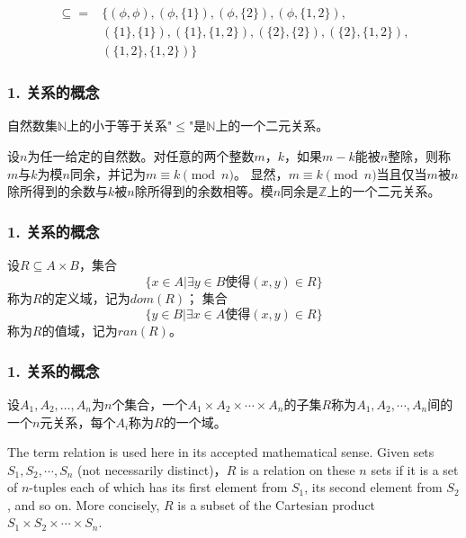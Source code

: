 \documentclass{beamer}
\begin{document}
\begin{CJK*}{UTF8}{gbsn}
\begin{frame}
\begin{Ex}
  \begin{equation*}
    \begin{split}
 \subseteq =& \{
 (\phi,\phi),(\phi,\{1\}),(\phi,\{2\}),(\phi,\{1,2\}),\\
 &(\{1\},\{1\}),(\{1\},\{1,2\}),
 (\{2\},\{2\}),(\{2\},\{1,2\}),\\&(\{1,2\},\{1,2\})
\}
    \end{split}
  \end{equation*}
\end{Ex}

\end{frame}

\begin{frame}
  \frametitle{1. 关系的概念}
  \begin{Ex}
    自然数集$\mathbb{N}$上的小于等于关系"$\leq$"是$\mathbb{N}$上的一个二元关系。
  \end{Ex}\pause
  \begin{Ex}\justifying\let\raggedright\justifying
    设$n$为任一给定的自然数。对任意的两个整数$m$，$k$，如果$m-k$能被$n$整除，则称$m$与$k$为模$n$同余，并记为$m\equiv k \pmod{n}$。
    显然，$m\equiv k \pmod{n}$当且仅当$m$被$n$除所得到的余数与$k$被$n$除所得到的余数相等。模$n$同余是$\mathbb{Z}$上的一个二元关系。
  \end{Ex}
\end{frame}

\begin{frame}
  \frametitle{1. 关系的概念}
  \begin{Def}
    设$R \subseteq A \times B$，集合
    \[\{x \in A | \exists y \in B \text{使得} (x,y) \in R\}\]
    称为$R$的\alert{定义域}，记为$dom(R)$； 集合
    \[\{y \in B | \exists x \in A \text{使得} (x,y) \in R\}\]
    称为$R$的\alert{值域}，记为$ran(R)$。
  \end{Def}
\end{frame}



\begin{frame}
  \frametitle{1. 关系的概念}
  \begin{Def}
    设$A_1, A_2, \ldots, A_n$为$n$个集合，一个$A_1\times A_2 \times \cdots \times A_n$的子集$R$称为$A_1, A_2, \cdots, A_n$间的一个\alert{$n$元关系}，每个$A_i$称为$R$的一个域。
  \end{Def}
\end{frame}

\begin{frame}
  The term relation is used here in its accepted mathematical sense. Given sets $S_1, S_2, \cdots, S_n$ (not necessarily distinct)，$R$ is a relation on these $n$ sets if it is a set of $n$-tuples each of which has its first element from $S_1$, its second element from $S_2$, and so on. More concisely, $R$ is a subset of the Cartesian product $S_1 \times S_2 \times \cdots \times S_n$.


\end{frame}
\end{CJK*}
\end{document}
